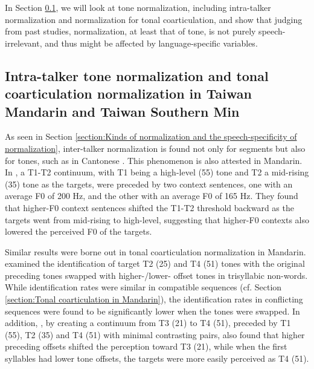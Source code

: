 In Section \ref{section:Intra-talker tone normalization and tonal coarticulation normalization in Taiwan Mandarin and Taiwan Southern Min}, we will look at tone normalization, including intra-talker normalization and normalization for tonal coarticulation, and show that judging from past studies, normalization, at least that of tone, is not purely speech-irrelevant, and thus might be affected by language-specific variables.

\subsection{Intra-talker tone normalization and tonal coarticulation normalization in Taiwan Mandarin and Taiwan Southern Min}\label{section:Intra-talker tone normalization and tonal coarticulation normalization in Taiwan Mandarin and Taiwan Southern Min}

As seen in Section \ref{section:Kinds of normalization and the speech-specificity of normalization}, inter-talker normalization is found not only for segments but also for tones, such as in Cantonese \citep{WongDiehl2003}. This phenomenon is also attested in Mandarin. In \cite{HuangHolt2009}, a T1-T2 continuum, with T1 being a high-level (55) tone and T2 a mid-rising (35) tone as the targets, were preceded by two context sentences, one with an average F0 of 200 Hz, and the other with an average F0 of 165 Hz. They found that higher-F0 context sentences shifted the T1-T2 threshold backward as the targets went from mid-rising to high-level, suggesting that higher-F0 contexts also lowered the perceived F0 of the targets. 

Similar results were borne out in tonal coarticulation normalization in Mandarin. \cite{Xu1994} examined the identification of target T2 (25) and T4 (51) tones with the original preceding tones swapped with higher-/lower- offset tones in trisyllabic non-words. While identification rates were similar in compatible sequences (cf. Section \ref{section:Tonal coarticulation in Mandarin}), the identification rates in conflicting sequences were found to be significantly lower when the tones were swapped. In addition, \cite{Zhangetal2022}, by creating a continuum from T3 (21) to T4 (51), preceded by T1 (55), T2 (35) and T4 (51) with minimal contrasting pairs, also found that higher preceding offsets shifted the perception toward T3 (21), while when the first syllables had lower tone offsets, the targets were more easily perceived as T4 (51).

